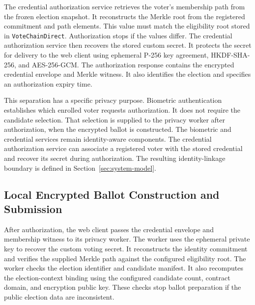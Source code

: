 The credential authorization service retrieves the voter's membership path
from the frozen election snapshot. It reconstructs the Merkle root from the
registered commitment and path elements. This value must match the
eligibility root stored in \texttt{VoteChainDirect}. Authorization stops if
the values differ.
The credential authorization service then recovers the stored custom secret.
It protects the secret for delivery to the web client using ephemeral P-256
key agreement, HKDF-SHA-256, and AES-256-GCM. The authorization response
contains the encrypted credential envelope and Merkle witness. It also
identifies the election and specifies an authorization expiry time.

This separation has a specific privacy purpose. Biometric authentication
establishes which enrolled voter requests authorization. It does not require
the candidate selection. That selection is supplied to the privacy worker
after authorization, when the encrypted ballot is constructed.
The biometric and credential services remain identity-aware components. The
credential authorization service can associate a registered voter with the
stored credential and recover its secret during authorization. The resulting
identity-linkage boundary is defined in Section~\ref{sec:system-model}.


\subsection{Local Encrypted Ballot Construction and Submission}
\label{subsec:architecture-ballot-submission}

After authorization, the web client passes the credential envelope and
membership witness to its privacy worker. The worker uses the ephemeral
private key to recover the custom voting secret. It reconstructs the
identity commitment and verifies the supplied Merkle path against the
configured eligibility root.
The worker checks the election identifier and candidate manifest. It also
recomputes the election-context binding using the configured candidate
count, contract domain, and encryption public key. These checks stop ballot
preparation if the public election data are inconsistent.

